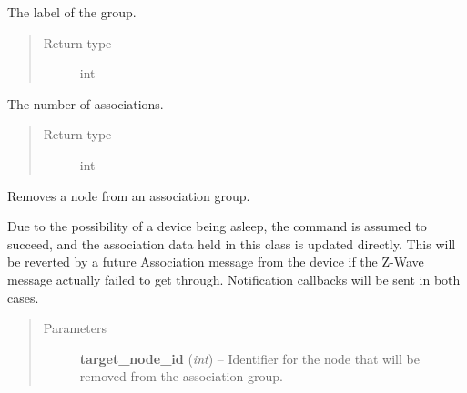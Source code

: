 \documentclass[letterpaper,10pt,english]{sphinxmanual}
\begin{document}
\begin{fulllineitems}
\begin{fulllineitems}
\begin{quote}
\begin{description}
\end{description}\end{quote}

\end{fulllineitems}


\begin{fulllineitems}
\label{group:openzwave.group.ZWaveGroup.label}
The label of the group.
\begin{quote}\begin{description}
\item[{Return type}] \leavevmode
int

\end{description}\end{quote}

\end{fulllineitems}


\begin{fulllineitems}
\label{group:openzwave.group.ZWaveGroup.max_associations}
The number of associations.
\begin{quote}\begin{description}
\item[{Return type}] \leavevmode
int

\end{description}\end{quote}

\end{fulllineitems}


\begin{fulllineitems}
\label{group:openzwave.group.ZWaveGroup.remove_association}
Removes a node from an association group.

Due to the possibility of a device being asleep, the command is assumed to
succeed, and the association data held in this class is updated directly.  This
will be reverted by a future Association message from the device if the Z-Wave
message actually failed to get through.   Notification callbacks will be sent
in both cases.
\begin{quote}\begin{description}
\item[{Parameters}] \leavevmode
\textbf{target\_node\_id} (\emph{int}) -- Identifier for the node that will be removed from the association group.

\end{description}\end{quote}

\end{fulllineitems}


\end{fulllineitems}
\end{document}
